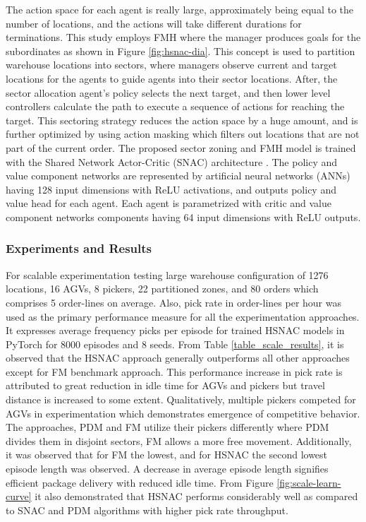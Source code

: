 \documentclass{article}
\begin{document}
The action space for each agent is really large, approximately being equal to the number of locations, and the actions will take different durations for terminations.
This study employs FMH where the manager produces goals for the subordinates as shown in Figure \ref{fig:hsnac-dia}.
This concept is used to partition warehouse locations into sectors, where managers observe current and target locations for the agents to guide agents into their sector locations.
After, the sector allocation agent’s policy selects the next target, and then lower level controllers calculate the path to execute a sequence of actions for reaching the target.
This sectoring strategy reduces the action space by a huge amount, and is further optimized by using action masking which filters out locations that are not part of the current order.
The proposed sector zoning and FMH model is trained with the Shared Network Actor-Critic (SNAC) architecture \cite{christianos2020shared}.
The policy and value component networks are represented by artificial neural networks (ANNs) having 128 input dimensions with ReLU activations, and outputs policy and value head for each agent.
Each agent is parametrized with critic and value component networks components having 64 input dimensions with ReLU outputs.


\subsubsection{Experiments and Results}


For scalable experimentation testing large warehouse configuration of 1276 locations, 16 AGVs, 8 pickers, 22 partitioned zones, and 80 orders which comprises 5 order-lines on average.
Also, pick rate in order-lines per hour was used as the primary performance measure for all the experimentation approaches.
It expresses average frequency picks per episode for trained HSNAC models in PyTorch for 8000 episodes and 8 seeds.
From Table \ref{table_scale_results}, it is observed that the HSNAC approach generally outperforms all other approaches except for FM benchmark approach.
This performance increase in pick rate is attributed to great reduction in idle time for AGVs and pickers but travel distance is increased to some extent.
Qualitatively, multiple pickers competed for AGVs in experimentation which demonstrates emergence of competitive behavior.
The approaches, PDM and FM utilize their pickers differently where PDM divides them in disjoint sectors, FM allows a more free movement.
Additionally, it was observed that for FM the lowest, and for HSNAC the second lowest episode length was observed.
A decrease in average episode length signifies efficient package delivery with reduced idle time.
From Figure \ref{fig:scale-learn-curve} it also demonstrated that HSNAC performs considerably well as compared to SNAC and PDM algorithms with higher pick rate throughput.
\end{document}
